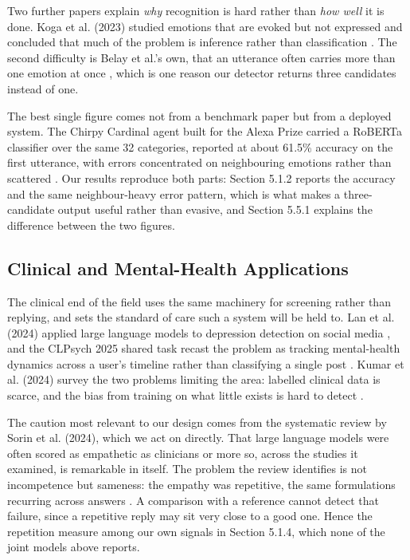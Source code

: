 Two further papers explain \textit{why }recognition is hard rather than \textit{how well} it is done. Koga et al. (2023) studied emotions that are evoked but not expressed and concluded that much of the problem is inference rather than classification \cite{koga2023implicit}. The second difficulty is Belay et al.'s own, that an utterance often carries more than one emotion at once \cite{belay2025}, which is one reason our detector returns three candidates instead of one.

The best single figure comes not from a benchmark paper but from a deployed system. The Chirpy Cardinal agent built for the Alexa Prize carried a RoBERTa classifier over the same 32 categories, reported at about 61.5\% accuracy on the first utterance, with errors concentrated on neighbouring emotions rather than scattered \cite{paranjape2020chirpy}. Our results reproduce both parts: Section 5.1.2 reports the accuracy and the same neighbour-heavy error pattern, which is what makes a three-candidate output useful rather than evasive, and Section 5.5.1 explains the difference between the two figures.

\subsection{Clinical and Mental-Health Applications}
\label{sec:2.2.6}

The clinical end of the field uses the same machinery for screening rather than replying, and sets the standard of care such a system will be held to. Lan et al. (2024) applied large language models to depression detection on social media \cite{lan2024depression}, and the CLPsych 2025 shared task recast the problem as tracking mental-health dynamics across a user's timeline rather than classifying a single post \cite{tseriotou2025clpsych}. Kumar et al. (2024) survey the two problems limiting the area: labelled clinical data is scarce, and the bias from training on what little exists is hard to detect \cite{kumar2024unlocking}.

The caution most relevant to our design comes from the systematic review by Sorin et al. (2024), which we act on directly. That large language models were often scored as empathetic as clinicians or more so, across the studies it examined, is remarkable in itself. The problem the review identifies is not incompetence but sameness: the empathy was repetitive, the same formulations recurring across answers \cite{sorin2024jmir}. A comparison with a reference cannot detect that failure, since a repetitive reply may sit very close to a good one. Hence the repetition measure among our own signals in Section 5.1.4, which none of the joint models above reports.

